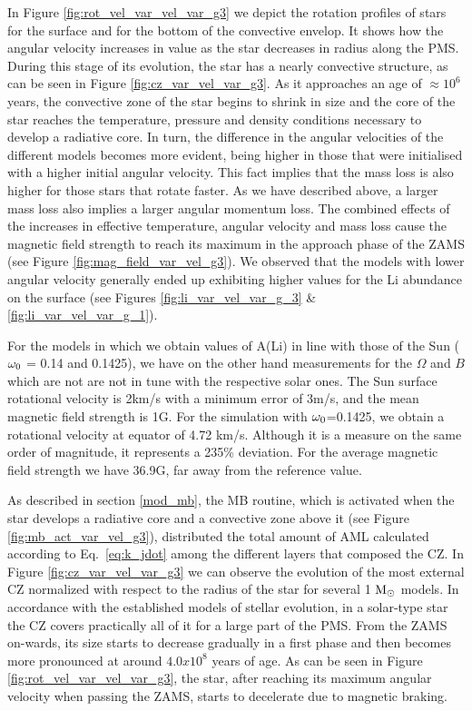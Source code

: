 \documentclass[fleqn,usenatbib]{mnras}
\begin{document}
In Figure \ref{fig:rot_vel_var_vel_var_g3} we depict the rotation profiles of stars for the surface and for the bottom of the convective envelop. It shows how the angular velocity increases in value as the star decreases in radius along the PMS. During this stage of its evolution, the star has a nearly convective structure, as can be seen in Figure \ref{fig:cz_var_vel_var_g3}. As it approaches an age of $\approx 10^6$ years, the convective zone of the star begins to shrink in size and the core of the star reaches the temperature, pressure and density conditions necessary to develop a radiative core. In turn, the difference in the angular velocities of the different models becomes more evident, being higher in those that were initialised with a higher initial angular velocity. This fact implies that the mass loss is also higher for those stars that rotate faster. As we have described above, a larger mass loss also implies a larger angular momentum loss. The combined effects of the increases in effective temperature, angular velocity and mass loss cause the magnetic field strength to reach its maximum in the approach phase of the ZAMS (see Figure \ref{fig:mag_field_var_vel_g3}). We observed that the models with lower angular velocity generally ended up exhibiting higher values for the Li abundance on the surface (see Figures \ref{fig:li_var_vel_var_g_3} \& \ref{fig:li_var_vel_var_g_1}).\par

For the models in which we obtain values of A(Li) in line with those of the Sun ($\omega_{\mathrm{0}}$ = 0.14 and 0.1425), we have on the other hand measurements for the $\Omega$ and $B$ which are not are not in tune with the respective solar ones. The Sun surface rotational velocity is 2km/s with a minimum error of 3m/s, and the mean magnetic field strength is 1G. For the simulation with $\omega_{\mathrm{0}}$=0.1425, we obtain a rotational velocity at equator of 4.72 km/s. Although it is a measure on the same order of magnitude, it represents a 235\% deviation. For the average magnetic field strength we have 36.9G, far away from the reference value.\par

As described in section \ref{mod_mb}, the MB routine, which is activated when the star develops a radiative core and a convective zone above it (see Figure \ref{fig:mb_act_var_vel_g3}), distributed the total amount of AML calculated according to Eq.~\ref{eq:k_jdot} among the different layers that composed the CZ. In Figure \ref{fig:cz_var_vel_var_g3} we can observe the evolution of the most external CZ normalized with respect to the radius of the star for several 1 $\mathrm{M}_\odot$ models. In accordance with the established models of stellar evolution, in a solar-type star the CZ covers practically all of it for a large part of the PMS. From the ZAMS on-wards, its size starts to decrease gradually in a first phase and then becomes more pronounced at around $4.0x10^8$ years of age. As can be seen in Figure \ref{fig:rot_vel_var_vel_var_g3}, the star, after reaching its maximum angular velocity when passing the ZAMS, starts to decelerate due to magnetic braking.\par
\end{document}

